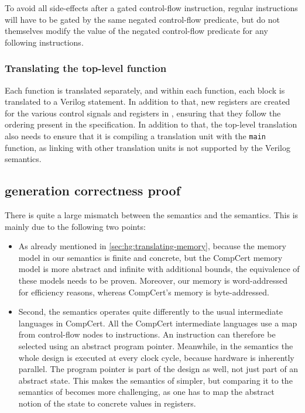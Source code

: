 To avoid all side-effects after a gated control-flow instruction, regular
instructions will have to be gated by the same negated control-flow predicate,
but do not themselves modify the value of the negated control-flow predicate for
any following instructions.


\subsubsection{Translating the top-level function}

Each \rtlsubpar{} function is translated separately, and within each function,
each block is translated to a Verilog statement.  In addition to that, new
registers are created for the various control signals and registers in \htl{},
ensuring that they follow the ordering present in the \htl{} specification.  In
addition to that, the top-level translation also needs to ensure that it is
compiling a translation unit with the \texttt{main} function, as linking with
other translation units is not supported by the Verilog semantics.

\subsection{\htl{} generation correctness proof}%
\label{sec:hg:htl-generation-correctness-proof}


There is quite a large mismatch between the \htl{} semantics and the
\rtlsubpar{} semantics.  This is mainly due to the following two points:

\begin{itemize}
\item As already mentioned in \cref{sec:hg:translating-memory}, because the
  memory model in our \htl{} semantics is finite and concrete, but the CompCert
  memory model is more abstract and infinite with additional bounds, the
  equivalence of these models needs to be proven.  Moreover, our memory is
  word-addressed for efficiency reasons, whereas CompCert's memory is
  byte-addressed.

\item Second, the \htl{} semantics operates quite differently to the usual
  intermediate languages in CompCert.  All the CompCert intermediate languages
  use a map from control-flow nodes to instructions.  An instruction can
  therefore be selected using an abstract program pointer. Meanwhile, in the
  \htl{} semantics the whole design is executed at every clock cycle, because
  hardware is inherently parallel. The program pointer is part of the design as
  well, not just part of an abstract state. This makes the semantics of \htl{}
  simpler, but comparing it to the semantics of \rtl{} becomes more challenging,
  as one has to map the abstract notion of the state to concrete values in
  registers.
\end{itemize}

